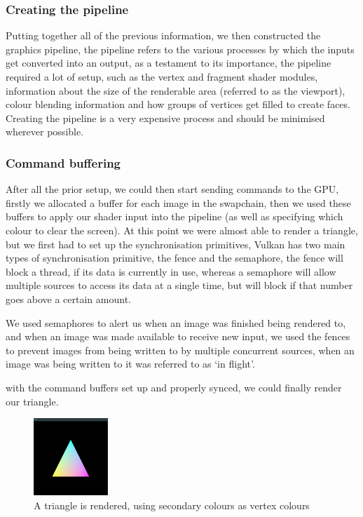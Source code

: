 \documentclass[../report.tex]{subfiles}
\begin{document}
\subsubsection{Creating the pipeline}
Putting together all of the previous information, we then constructed the graphics pipeline, the pipeline refers to the various processes by which the inputs get converted into an output, as a testament to its importance, the pipeline required a lot of setup, such as the vertex and fragment shader modules, information about the size of the renderable area (referred to as the viewport), colour blending information and how groups of vertices get filled to create faces.
Creating the pipeline is a very expensive process and should be minimised wherever possible.

\subsubsection{Command buffering}
After all the prior setup, we could then start sending commands to the GPU, 
firstly we allocated a buffer for each image in the swapchain, then we used these buffers to apply our shader input into the pipeline (as well as specifying which colour to clear the screen).
At this point we were almost able to render a triangle, but we first had to set up the synchronisation primitives, Vulkan has two main types of synchronisation primitive, the fence and the semaphore, the fence will block a thread, if its data is currently in use, whereas a semaphore will allow multiple sources to access its data at a single time, but will block if that number goes above a certain amount.

We used semaphores to alert us when an image was finished being rendered to, and when an image was made available to receive new input, we used the fences to prevent images from being written to by multiple concurrent sources, when an image was being written to it was referred to as `in flight'.

with the command buffers set up and properly synced, we could finally render our triangle.


\begin{figure}[h]
    \centering
    \includegraphics[width=0.25\textwidth]{images/window_triangle.png}
    \caption{A triangle is rendered, using secondary colours as vertex colours}
\end{figure}
\end{document}
